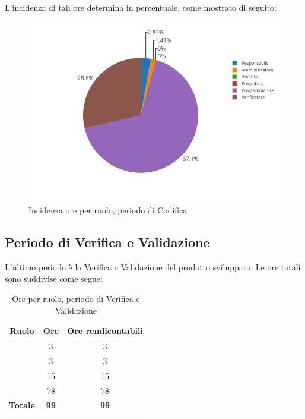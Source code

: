 L'incidenza di tali ore determina in percentuale, come mostrato di seguito:
\begin{figure}[H]
	\centering
	\includegraphics[scale=0.6]{img/Codifica.png}
	\caption{Incidenza ore per ruolo, periodo di Codifica}
\end{figure}

\newpage
\subsection{Periodo di Verifica e Validazione}
L'ultimo periodo è la Verifica e Validazione del prodotto sviluppato. Le ore totali sono suddivise come segue:

\begin{table}[H]
	\begin{center}
		\begin{tabular}{|c|c|c|}
			\hline
			\textbf{Ruolo}	& \textbf{Ore}	& \textbf{Ore rendicontabili} \\
			\hline
			\Res	&	3  &	3	\\
			\hline
			\Amm	&	3  &	3	\\
			\hline
			\Prog   &	15  &	15	\\
			\hline
			\Ver	&	78	&	78	\\
			\hline
			\textbf{Totale} & \textbf{99} & \textbf{99} \\
			\hline
		\end{tabular}
	\end{center}
	\caption{Ore per ruolo, periodo di Verifica e Validazione}
\end{table}

